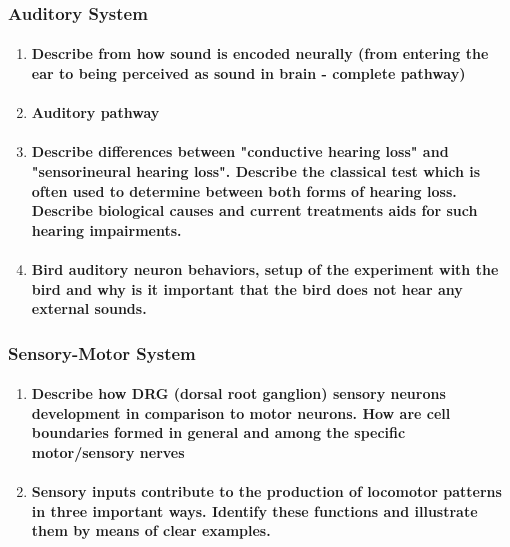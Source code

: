 \documentclass[12pt,article,oneside,a4paper]{memoir}
\begin{document}
\subsubsection{Auditory System}
\begin{enumerate}
\item \paragraph{Describe from how sound is encoded neurally (from entering the ear to being perceived as sound in brain - complete pathway)}

\item \paragraph{Auditory pathway}

\item \paragraph{Describe differences between "conductive hearing loss" and "sensorineural hearing loss". Describe the classical test which is often used to determine between both forms of hearing loss. Describe biological causes and current treatments aids for such hearing impairments.}

\item \paragraph{Bird auditory neuron behaviors, setup of the experiment with the bird and why is it important that the bird does not hear any external sounds.}

\end{enumerate}

\subsubsection{Sensory-Motor System}
\begin{enumerate}
\item \paragraph{Describe how DRG (dorsal root ganglion) sensory neurons development in comparison to motor neurons. How are cell boundaries formed in general and among the specific motor/sensory nerves}

\item \paragraph{Sensory inputs contribute to the production of locomotor patterns in three important ways. Identify these functions and illustrate them by means of clear examples.}

\end{enumerate}
\end{document}
